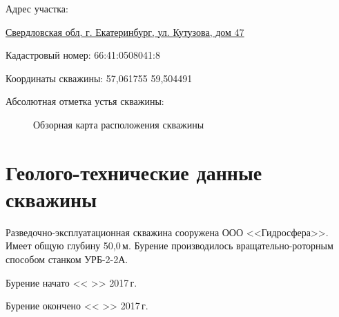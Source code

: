\documentclass[a4paper,12pt]{article} %
\newcommand{\txtExecutor}{ООО <<Гидросфера>>}			%
\newcommand{\txtYear}{2017}			%
\newcommand{\txtAddress}{Свердловская обл, г. Екатеринбург, ул. Кутузова, дом 47}
\newcommand{\txtHeight}{ }							%
\newcommand{\txtCadaster}{66:41:0508041:8} 			%
\newcommand{\txtCoords}{57,061755 59,504491}		%
\newcommand{\txtDepth}{50,0}						%
\begin{document}
	Адрес участка: 

	\underline{\txtAddress}

	\bigskip

	
	Кадастровый номер: \txtCadaster

	Координаты скважины: \txtCoords
	
	Абсолютная отметка устья скважины: \txtHeight

	\begin{figure}[h]
		\caption{Обзорная карта расположения скважины}
	\end{figure}

    \section*{Геолого-технические данные скважины}

    Разведочно-эксплуатационная скважина сооружена \txtExecutor. Имеет общую глубину \txtDepth \,м.   Бурение производилось вращательно-роторным способом станком УРБ-2-2А.

    \bigskip

    Бурение начато << >> \txtYear \,г. 

	Бурение окончено << >> \txtYear \,г.
\end{document}
